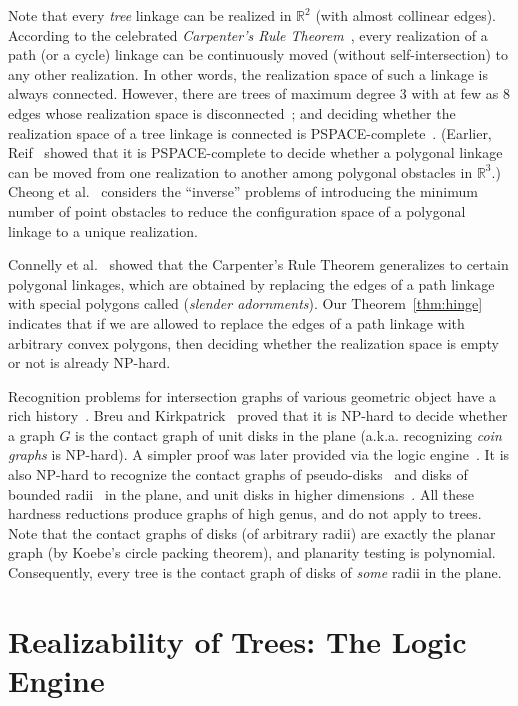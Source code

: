 \documentclass{llncs}
\newcommand{\RR}{\mathbb{R}} %
\begin{document}
Note that every \emph{tree} linkage can be realized in $\RR^2$ (with almost collinear edges). According to the celebrated \emph{Carpenter's Rule Theorem}~\cite{CDR03,Str05}, every realization of a path (or a cycle) linkage can be continuously moved (without self-intersection) to any other realization. In other words, the realization space of such a linkage is always connected. However, there are trees of maximum degree 3 with at few as 8 edges whose realization space is disconnected~\cite{BCD+09}; and deciding whether the realization space of a tree linkage
is connected is PSPACE-complete~\cite{AKR+04}. (Earlier, Reif~\cite{Rei79} showed that it is PSPACE-complete to decide whether a polygonal linkage can be moved from one realization to another among polygonal obstacles in $\RR^3$.) Cheong et al.~\cite{CdG+07} considers the ``inverse'' problems of introducing the minimum number of point obstacles to reduce the configuration space of a polygonal linkage to a unique realization.


Connelly et al.~\cite{CDD+10} showed that the Carpenter's Rule Theorem generalizes to certain polygonal linkages, which are obtained by replacing the edges of a path linkage with special polygons called (\emph{slender adornments}). Our Theorem~\ref{thm:hinge} indicates that if we are allowed to replace the edges of a path linkage with arbitrary convex polygons, then deciding whether the realization space is empty or not is already NP-hard.

Recognition problems for intersection graphs of various geometric object have a rich history~\cite{HK01}. Breu and Kirkpatrick~\cite{BK98} proved that it is NP-hard to decide whether a graph $G$ is the contact graph of unit disks in the plane (a.k.a. recognizing \emph{coin graphs} is NP-hard). A simpler proof was later provided via the logic engine~\cite{BET+99}. It is also NP-hard to recognize the contact graphs of pseudo-disks~\cite{HK01} and disks of bounded radii~\cite{BK95} in the plane, and unit disks in higher dimensions~\cite{Hli97,HK01}. All these hardness reductions produce graphs of high genus, and do not apply to trees. Note that the contact graphs of disks (of arbitrary radii) are exactly the planar graph (by Koebe's circle packing theorem), and planarity testing is polynomial. Consequently, every tree is the contact graph of disks of \emph{some} radii in the plane.


\section{Realizability of Trees: The Logic Engine\label{sec:logic}}
\end{document}
